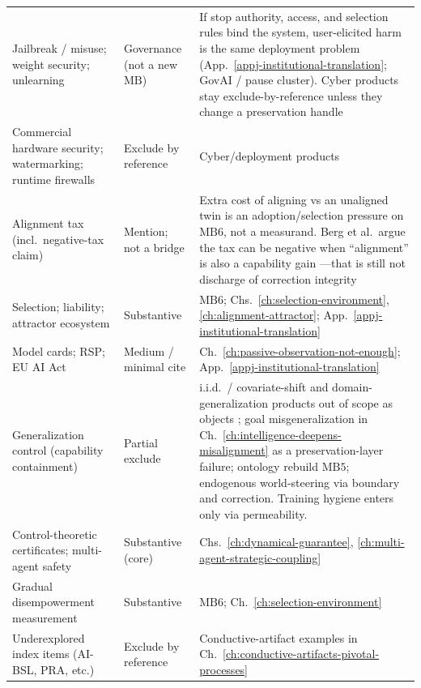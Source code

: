 \begin{longtable}{@{}p{}p{}p{}@{}}
Jailbreak / misuse; weight security; unlearning & Governance (not a new \(\text{MB}\)) & If stop authority, access, and selection rules bind the system, user-elicited harm is the same deployment problem (App.~\ref{appj-institutional-translation}; GovAI / pause cluster). Cyber products stay exclude-by-reference unless they change a preservation handle \\
Commercial hardware security; watermarking; runtime firewalls & Exclude by reference & Cyber/deployment products \\
Alignment tax (incl.\ negative-tax claim) & Mention; not a bridge & Extra cost of aligning vs an unaligned twin is an adoption/selection pressure on \(\text{MB6}\), not a measurand. Berg et al.\ argue the tax can be negative when ``alignment'' is also a capability gain \autocite{berg2024negativetax}---that is still not discharge of correction integrity \\
Selection; liability; attractor ecosystem & Substantive & \(\text{MB6}\); Chs.~\ref{ch:selection-environment}, \ref{ch:alignment-attractor}; App.~\ref{appj-institutional-translation} \\
Model cards; RSP; EU AI Act & Medium / minimal cite & Ch.~\ref{ch:passive-observation-not-enough}; App.~\ref{appj-institutional-translation} \\
Generalization control (capability containment) & Partial exclude & i.i.d.\ / covariate-shift and domain-generalization products out of scope as objects \autocite{amodei2016concrete}; goal misgeneralization in Ch.~\ref{ch:intelligence-deepens-misalignment} as a preservation-layer failure; ontology rebuild \(\text{MB5}\); endogenous world-steering via boundary and correction. Training hygiene enters only via permeability. \\
Control-theoretic certificates; multi-agent safety & Substantive (core) & Chs.~\ref{ch:dynamical-guarantee}, \ref{ch:multi-agent-strategic-coupling} \\
Gradual disempowerment measurement & Substantive & \(\text{MB6}\); Ch.~\ref{ch:selection-environment} \\
Underexplored index items (AI-BSL, PRA, etc.) & Exclude by reference & Conductive-artifact examples in Ch.~\ref{ch:conductive-artifacts-pivotal-processes} \\
\end{longtable}
\renewcommand{\arraystretch}{1.0}

\authbarneedspace
